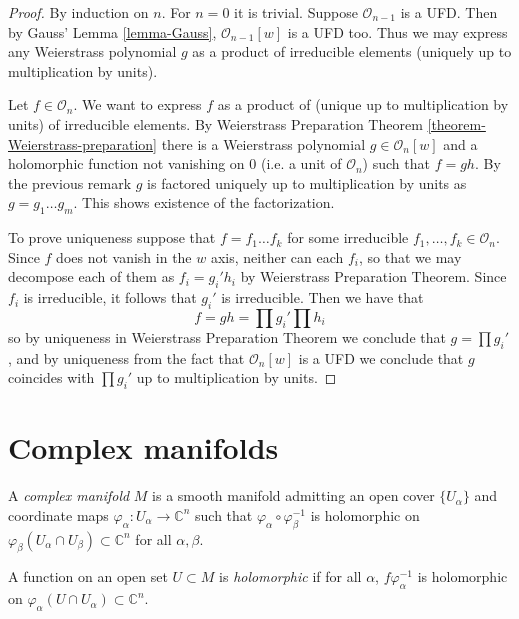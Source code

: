 \begin{proof}
By induction on $n$. For $n=0$ it is trivial. Suppose $\mathcal{O}_{n-1}$ is a
UFD. Then by Gauss' Lemma \ref{lemma-Gauss}, $\mathcal{O}_{n-1}[w]$ is a UFD
too. Thus we may express any Weierstrass polynomial $g$ as a product of
irreducible elements (uniquely up to multiplication by units).

Let $f\in \mathcal{O}_n$. We want to express $f$ as a product of (unique up to
multiplication by units) of irreducible elements. By Weierstrass Preparation
Theorem \ref{theorem-Weierstrass-preparation} there is a Weierstrass polynomial
$g\in\mathcal{O}_n[w]$ and a holomorphic function not vanishing on $0$ (i.e. a
unit of $\mathcal{O}_n$) such that $f=gh$. By the previous remark $g$ is
factored uniquely up to multiplication by units as $g=g_1\ldots g_m$. This shows
existence of the factorization.

To prove uniqueness suppose that $f=f_1\ldots f_k$ for some irreducible
$f_1,\ldots,f_k\in\mathcal{O}_n$. Since $f$ does not vanish in the $w$ axis,
neither can each $f_i$, so that we may decompose each of them as  $f_i=g_i'h_i$
by Weierstrass Preparation Theorem. Since $f_i$ is irreducible, it follows that
$g_i'$ is irreducible. Then we have that $$ f=gh=\prod g_i'\prod h_i $$ so by
uniqueness in Weierstrass Preparation Theorem we conclude that $g=\prod g_i'$,
and by uniqueness from the fact that  $\mathcal{O}_n[w]$ is a UFD we conclude
that $g$ coincides with $\prod g_i'$ up to multiplication by units.
\end{proof}

\section{Complex manifolds}
\label{section-complex-manifolds}

\begin{definition}
\label{definition-complex-manifold}
A {\it complex manifold} $M$ is a smooth manifold admitting an open cover
$\{U_\alpha\}$ and coordinate maps $\varphi_\alpha:U_\alpha\to\mathbb{C}^n$ such
that $\varphi_\alpha\circ\varphi_\beta^{-1}$ is holomorphic on
$\varphi_\beta(U_\alpha\cap U_\beta)\subset\mathbb{C}^n$ for all $\alpha,\beta$.
\end{definition}

\begin{definition}
\label{definition-holomorphic-function-on-complex-manifold}
A function on an open set $U\subset M$ is {\it holomorphic} if for all $\alpha$,
$f\varphi_\alpha^{-1}$ is holomorphic on 
$\varphi_\alpha(U\cap U_\alpha)\subset\mathbb{C}^n$.
\end{definition}

